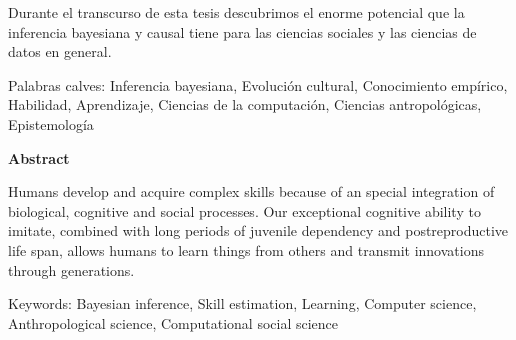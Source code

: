 \documentclass[a4paper,10pt]{book}
\theoremstyle{definition}
\begin{document}

Durante el transcurso de esta tesis descubrimos el enorme potencial que la inferencia bayesiana y causal tiene para las ciencias sociales y las ciencias de datos en general.

\vspace{0.3cm}

\noindent Palabras calves: Inferencia bayesiana, Evoluci\'on cultural, Conocimiento emp\'irico, Habilidad, Aprendizaje, Ciencias de la computaci\'on, Ciencias antropol\'ogicas, Epistemolog\'ia


\newpage

\begin{center}
\textbf{Abstract}
\end{center}



Humans develop and acquire complex skills because of an special integration of biological, cognitive and social processes.
%
Our exceptional cognitive ability to imitate, combined with long periods of juvenile dependency and postreproductive life span, allows humans to learn things from others and transmit innovations through generations.



\vspace{0.3cm}

\noindent Keywords: Bayesian inference, Skill estimation, Learning, Computer science, Anthropological science, Computational social science 



\tableofcontents

\newpage 
\end{document}
